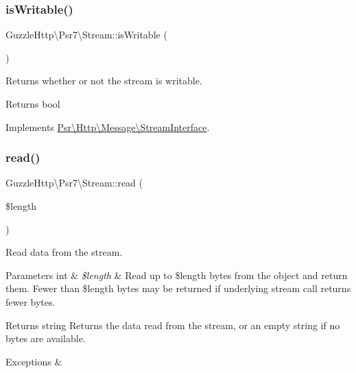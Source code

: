 \subsubsection{\texorpdfstring{is\+Writable()}{isWritable()}}
{\footnotesize\ttfamily Guzzle\+Http\textbackslash{}\+Psr7\textbackslash{}\+Stream\+::is\+Writable (\begin{DoxyParamCaption}{ }\end{DoxyParamCaption})}

Returns whether or not the stream is writable.

\begin{DoxyReturn}{Returns}
bool 
\end{DoxyReturn}


Implements \hyperlink{interfacePsr_1_1Http_1_1Message_1_1StreamInterface_a79287940d75d1951b831879fdc493883}{Psr\textbackslash{}\+Http\textbackslash{}\+Message\textbackslash{}\+Stream\+Interface}.

\mbox{\label{classGuzzleHttp_1_1Psr7_1_1Stream_a4f9990fde8a72f6555cc3a55ee6c9a98}} 
\subsubsection{\texorpdfstring{read()}{read()}}
{\footnotesize\ttfamily Guzzle\+Http\textbackslash{}\+Psr7\textbackslash{}\+Stream\+::read (\begin{DoxyParamCaption}\item[{}]{\$length }\end{DoxyParamCaption})}

Read data from the stream.


\begin{DoxyParams}[1]{Parameters}
int & {\em \$length} & Read up to \$length bytes from the object and return them. Fewer than \$length bytes may be returned if underlying stream call returns fewer bytes. \\
\hline
\end{DoxyParams}
\begin{DoxyReturn}{Returns}
string Returns the data read from the stream, or an empty string if no bytes are available. 
\end{DoxyReturn}

\begin{DoxyExceptions}{Exceptions}
{\em } & \\
\hline
\end{DoxyExceptions}


